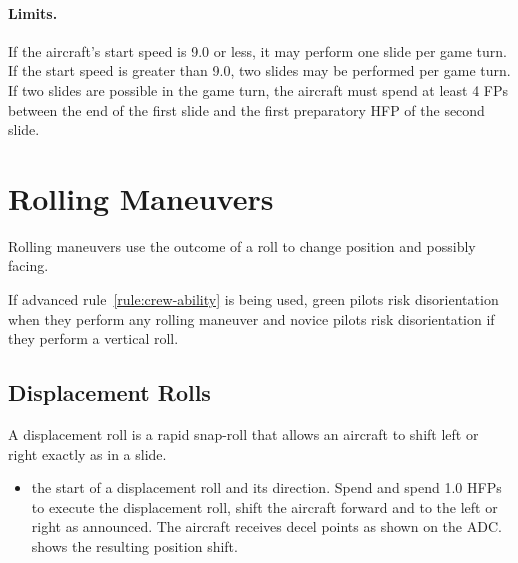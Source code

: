 \paragraph{Limits.} If the aircraft's start speed is 9.0 or less, it may perform one slide per game turn. If the start speed is greater than 9.0, two slides may be performed per game turn. If two slides are possible in the game turn, the aircraft must spend at least 4 FPs between the end of the first slide and the first preparatory HFP of the second slide.

\section{Rolling Maneuvers}
\label{rule:rolling-maneuvers}

Rolling maneuvers use the outcome of a roll to change position and possibly facing.

If advanced rule~\ref{rule:crew-ability} is being used, green pilots risk disorientation when they perform any rolling maneuver and novice pilots risk disorientation if they perform a vertical roll.

\subsection{Displacement Rolls}

A displacement roll is a rapid snap-roll that allows an aircraft to shift left or right exactly as in a slide.

\begin{itemize}
    \item{}  the start of a displacement roll and its direction. Spend  and spend 1.0 HFPs to execute the displacement roll, shift the aircraft forward and to the left or right as announced.  The aircraft receives decel points as shown on the ADC.  shows the resulting position shift.

\end{itemize}

